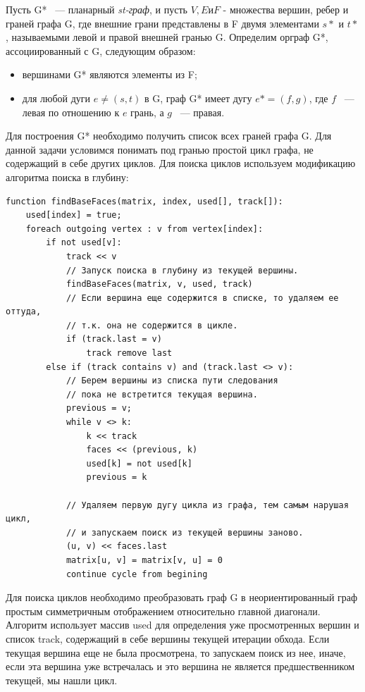 Пусть G* ~--- планарный \textit{st-граф}, и пусть $ V, E и F $ - множества вершин, ребер и граней графа G, где внешние грани представлены в F двумя элементами $ s* $ и $ t* $, называемыми левой и правой внешней гранью G.
Определим орграф G*, ассоциированный с G, следующим образом:
\begin{itemize}
\item вершинами G* являются элементы из F;
\item для любой дуги $ e \neq (s, t) $ в G, граф G* имеет дугу $ e* = (f, g) $, где $ f $ ~--- левая по отношению к $ e $ грань, а $ g $ ~--- правая.
\end{itemize}

Для построения G* необходимо получить список всех граней графа G. Для данной задачи условимся понимать под гранью простой цикл графа, не содержащий в себе других циклов. Для поиска циклов используем модификацию алгоритма поиска в глубину:
\begin{verbatim}
function findBaseFaces(matrix, index, used[], track[]):
    used[index] = true;
    foreach outgoing vertex : v from vertex[index]:
        if not used[v]:
            track << v
            // Запуск поиска в глубину из текущей вершины.
            findBaseFaces(matrix, v, used, track)
            // Если вершина еще содержится в списке, то удаляем ее оттуда,
            // т.к. она не содержится в цикле.
            if (track.last = v)
                track remove last
        else if (track contains v) and (track.last <> v):
            // Берем вершины из списка пути следования
            // пока не встретится текущая вершина.
            previous = v;
            while v <> k:
                k << track
                faces << (previous, k)
                used[k] = not used[k]
                previous = k

            // Удаляем первую дугу цикла из графа, тем самым нарушая цикл,
            // и запускаем поиск из текущей вершины заново.
            (u, v) << faces.last
            matrix[u, v] = matrix[v, u] = 0
            continue cycle from begining
\end{verbatim}

Для поиска циклов необходимо преобразовать граф G в неориентированный граф простым симметричным отображением относительно главной диагонали. Алгоритм использует массив used для определения уже просмотренных вершин и список track, содержащий в себе вершины текущей итерации обхода. Если текущая вершина еще не была просмотрена, то запускаем поиск из нее, иначе, если эта вершина уже встречалась и это вершина не является предшественником текущей, мы нашли цикл.

